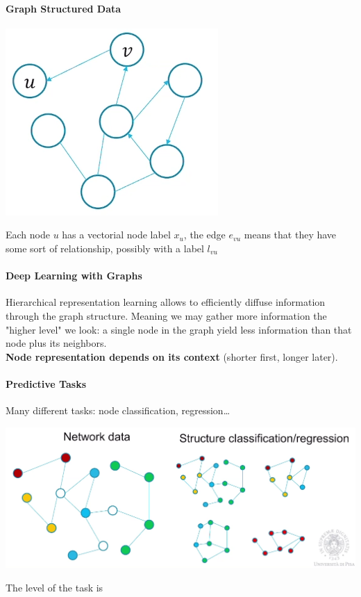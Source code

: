\documentclass[10pt]{report}
\begin{document}
\paragraph{Graph Structured Data}
\begin{center}
	\includegraphics[scale=0.5]{191.png}
\end{center}
Each node $u$ has a vectorial node label $x_u$, the edge $e_{vu}$ means that they have some sort of relationship, possibly with a label $l_{vu}$
\paragraph{Deep Learning with Graphs} Hierarchical representation learning allows to efficiently diffuse information through the graph structure. Meaning we may gather more information the "higher level" we look: a single node in the graph yield less information than that node plus its neighbors.\\\textbf{Node representation depends on its context} (shorter first, longer later).
\paragraph{Predictive Tasks} Many different tasks: node classification, regression\ldots
\begin{center}
	\includegraphics[scale=0.5]{192.png}
\end{center}
The level of the task is %
\end{document}
